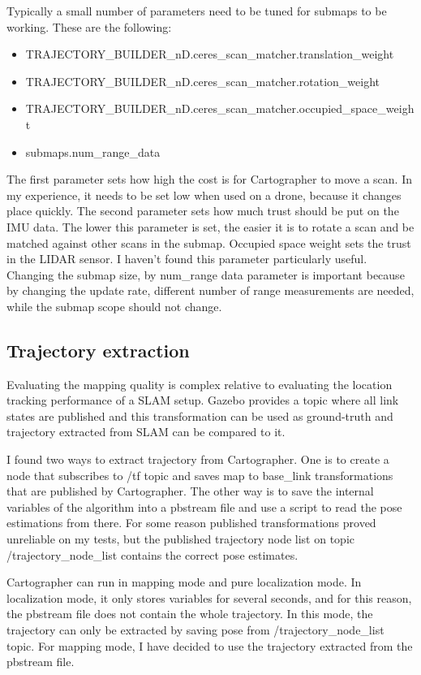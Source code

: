 Typically a small number of parameters need to be tuned for submaps to be working. These are the following:
\begin{itemize}
    \item TRAJECTORY\_BUILDER\_nD.ceres\_scan\_matcher.translation\_weight
    \item TRAJECTORY\_BUILDER\_nD.ceres\_scan\_matcher.rotation\_weight
    \item TRAJECTORY\_BUILDER\_nD.ceres\_scan\_matcher.occupied\_space\_weight
    \item submaps.num\_range\_data
\end{itemize}
The first parameter sets how high the cost is for Cartographer to move a scan. In my experience,
it needs to be set low when used on a drone, because it changes place quickly. The second parameter sets
how much trust should be put on the IMU data. The lower this parameter is set, the easier it is to
rotate a scan and be matched against other scans in the submap. Occupied space weight sets the
trust in the LIDAR sensor. I haven't found this parameter particularly useful. Changing the submap
size, by num\_range data parameter is important because by changing the update rate, different
number of range measurements are needed, while the submap scope should not change.


\subsection{Trajectory extraction}\label{sect:trajectory_extraction}
Evaluating the mapping quality is complex relative to evaluating the location tracking performance
of a SLAM setup. Gazebo provides a topic where all link states are published and this transformation
can be used as ground-truth and trajectory extracted from SLAM can be compared to it.

I found two ways to extract trajectory from Cartographer. One is to create a node that subscribes to
/tf topic and saves map to base\_link transformations that are published by Cartographer. The other
way is to save the internal variables of the algorithm into a pbstream file and use a script to read
the pose estimations from there. For some reason published transformations proved unreliable on my
tests, but the published trajectory node list on topic /trajectory\_node\_list contains the correct
pose estimates.

Cartographer can run in mapping mode and pure localization mode. In localization mode, it
only stores variables for several seconds, and for this reason, the pbstream file does not contain
the whole trajectory. In this mode, the trajectory can only be extracted by saving pose from
/trajectory\_node\_list topic. For mapping mode, I have decided to use the trajectory extracted from
the pbstream file.




